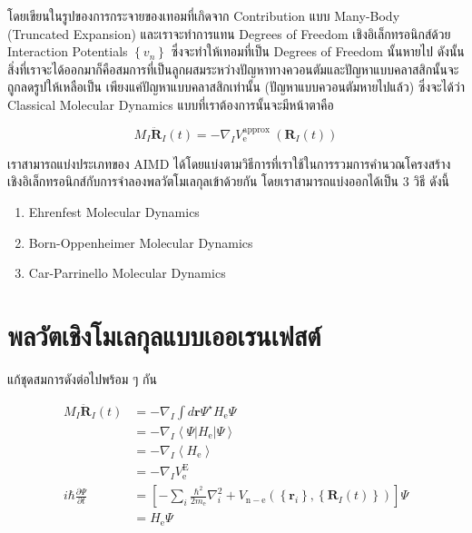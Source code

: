 \noindent โดยเขียนในรูปของการกระจายของเทอมที่เกิดจาก Contribution แบบ Many-Body (Truncated Expansion) และเราจะทำการแทน
Degrees of Freedom เชิงอิเล็กทรอนิกส์ด้วย Interaction Potentials $\left\{v_n\right\}$ ซึ่งจะทำให้เทอมที่เป็น Degrees of
Freedom นั้นหายไป ดังนั้นสิ่งที่เราจะได้ออกมาก็คือสมการที่เป็นลูกผสมระหว่างปัญหาทางควอนตัมและปัญหาแบบคลาสสิกนั้นจะถูกลดรูปให้เหลือเป็น%
เพียงแค่ปัญหาแบบคลาสสิกเท่านั้น (ปัญหาแบบควอนตัมหายไปแล้ว) ซึ่งจะได้ว่า Classical Molecular Dynamics แบบที่เราต้องการนั้นจะมีหน้าตาคือ

\begin{equation}
  M_I \ddot{\mathbf{R}}_I(t)
  =
  -\nabla_I V_{\mathrm{e}}^{\text {approx }}\left(\mathbf{R}_I(t)\right)
\end{equation}

เราสามารถแบ่งประเภทของ AIMD ได้โดยแบ่งตามวิธีการที่เราใช้ในการรวมการคำนวณโครงสร้างเชิงอิเล็กทรอนิกส์กับการจำลองพลวัตโมเลกุลเข้าด้วยกัน
โดยเราสามารถแบ่งออกได้เป็น 3 วิธี ดังนี้

\begin{enumerate}[topsep=0pt,noitemsep]
  \setlength\itemsep{1em}
  \item Ehrenfest Molecular Dynamics

  \item Born-Oppenheimer Molecular Dynamics

  \item Car-Parrinello Molecular Dynamics
\end{enumerate}

\section{พลวัตเชิงโมเลกุลแบบเออเรนเฟสต์}

แก้ชุดสมการดังต่อไปพร้อม ๆ กัน

\begin{align}
  M_I \ddot{\mathbf{R}}_I(t)
   & = -\nabla_I \int d \mathbf{r} \Psi^{\star} H_{\mathrm{e}} \Psi                                                       \\
   & = -\nabla_I\left\langle\Psi\left|H_{\mathrm{e}}\right| \Psi\right\rangle                                             \\
   & = -\nabla_I\left\langle H_{\mathrm{e}}\right\rangle                                                                   \\
  \label{eq:Ehrenfest_coupled_eq_1}
   & = -\nabla_I V_{\mathrm{e}}^{\mathrm{E}}                                                                              \\
  i \hbar \frac{\partial \Psi}{\partial t}
   & = \left[-\sum_i \frac{\hbar^2}{2 m_{\mathrm{e}}}
  \nabla_i^2+V_{\mathrm{n}-\mathrm{e}}\left(\left\{\mathbf{r}_i\right\},\left\{\mathbf{R}_I(t)\right\}\right)\right] \Psi \\
  \label{eq:Ehrenfest_coupled_eq_2}
   & = H_{\mathrm{e}} \Psi
\end{align}


